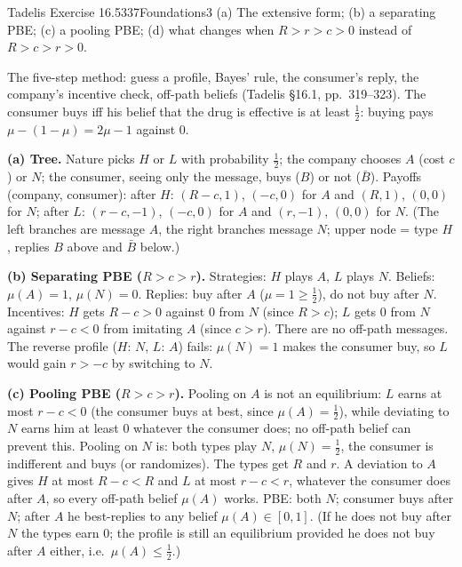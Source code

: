 \begin{exsol}{Tadelis Exercise 16.5}{337}{Foundations}{3}
\asked (a) The extensive form; (b) a separating PBE; (c) a pooling PBE; (d) what changes when
$R > r > c > 0$ instead of $R > c > r > 0$.

\method The five-step method: guess a profile, Bayes' rule, the consumer's reply, the company's
incentive check, off-path beliefs (Tadelis \S16.1, pp.~319--323). The consumer buys iff his belief
that the drug is effective is at least $\frac12$: buying pays $\mu - (1 - \mu) = 2\mu - 1$ against $0$.

\solution \textbf{(a) Tree.} Nature picks $H$ or $L$ with probability $\frac12$; the company chooses
$A$ (cost $c$) or $N$; the consumer, seeing only the message, buys ($B$) or not ($\bar B$).
Payoffs (company, consumer): after $H$: $(R - c, 1)$, $(-c, 0)$ for $A$ and $(R, 1)$, $(0, 0)$ for
$N$; after $L$: $(r - c, -1)$, $(-c, 0)$ for $A$ and $(r, -1)$, $(0, 0)$ for $N$.
(The left branches are message $A$, the right branches message $N$; upper node = type $H$, replies
$B$ above and $\bar B$ below.)

\textbf{(b) Separating PBE ($R > c > r$).} Strategies: $H$ plays $A$, $L$ plays $N$. Beliefs:
$\mu(A) = 1$, $\mu(N) = 0$. Replies: buy after $A$ ($\mu = 1 \ge \frac12$), do not buy after $N$.
Incentives: $H$ gets $R - c > 0$ against $0$ from $N$ (since $R > c$); $L$ gets $0$ from $N$ against
$r - c < 0$ from imitating $A$ (since $c > r$). There are no off-path messages. The reverse
profile ($H$: $N$, $L$: $A$) fails: $\mu(N) = 1$ makes the consumer buy, so $L$ would gain $r > -c$
by switching to $N$.

\textbf{(c) Pooling PBE ($R > c > r$).} Pooling on $A$ is not an equilibrium: $L$ earns at most
$r - c < 0$ (the consumer buys at best, since $\mu(A) = \frac12$), while deviating to $N$ earns him
at least $0$ whatever the consumer does; no off-path belief can prevent this.
Pooling on $N$ is: both types play $N$, $\mu(N) = \frac12$, the consumer is indifferent and buys
(or randomizes). The types get $R$ and $r$. A deviation to $A$ gives $H$ at most $R - c < R$ and $L$
at most $r - c < r$, whatever the consumer does after $A$, so every off-path belief $\mu(A)$ works.
PBE: both $N$; consumer buys after $N$; after $A$ he best-replies to any belief $\mu(A) \in [0,1]$.
(If he does not buy after $N$ the types earn $0$; the profile is still an equilibrium provided he does
not buy after $A$ either, i.e.\ $\mu(A) \le \frac12$.)


\end{exsol}
